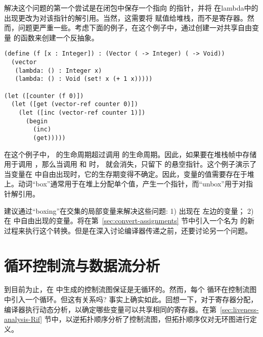 \documentclass[11pt]{book}
\begin{document}
解决这个问题的第一个尝试是在闭包中保存一个指向
 的指针，并将  在lambda中的出现更改为对该指针的解引用。当然，这需要将  赋值给堆栈，而不是寄存器。然而，问题更严重一些。考虑下面的例子，在这个例子中，通过创建一对共享自由变量  的函数来创建一个反抽象。
\begin{lstlisting}
(define (f [x : Integer]) : (Vector ( -> Integer) ( -> Void))
  (vector
   (lambda: () : Integer x)
   (lambda: () : Void (set! x (+ 1 x)))))

(let ([counter (f 0)])
  (let ([get (vector-ref counter 0)])
    (let ([inc (vector-ref counter 1)])
      (begin
        (inc)
        (get)))))
\end{lstlisting}
在这个例子中，  的生命周期超过调用  的生命周期。因此，如果要在堆栈帧中存储  用于调用  ，那么当调用  和  时， 就会消失，只留下
 的悬空指针。这个例子演示了当变量在  中自由出现时，它的生存期变得不确定。因此，变量的值需要存在于堆上。动词“box”通常用于在堆上分配单个值，产生一个指针，而“unbox”用于对指针解引用。

建议通过“boxing”在交集的局部变量来解决这些问题: 1) 出现在  左边的变量； 2) 在  中自由出现的变量。将在第~\ref{sec:convert-assignments} 节中引入一个名为
 的新过程来执行这个转换。但是在深入讨论编译器传递之前，还要讨论另一个问题。

\section{循环控制流与数据流分析}
\label{sec:dataflow-analysis}

到目前为止，在
 中生成的控制流图保证是无循环的。然而，每个
 循环在控制流图中引入一个循环。但这有关系吗?
%
事实上确实如此。回想一下，对于寄存器分配，编译器执行动态分析，以确定哪些变量可以共享相同的寄存器。在第~\ref{sec:liveness-analysis-Rif} 节中，以逆拓扑顺序分析了控制流图，但拓扑顺序仅对无环图进行定义。
\end{document}
